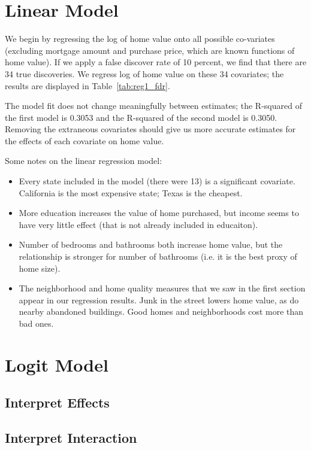 \documentclass[11pt, fleqn]{article}
\begin{document}
\section{Linear Model}

We begin by regressing the log of home value onto all possible co-variates (excluding mortgage amount and purchase price, which are known functions of home value). If we apply a false discover rate of 10 percent, we find that there are 34 true discoveries. We regress log of home value on these 34 covariates; the results are displayed in Table~\vref{tab:reg1_fdr}.

The model fit does not change meaningfully between estimates; the R-squared of the first model is 0.3053 and the R-squared of the second model is 0.3050. Removing the extraneous covariates should give us more accurate estimates for the effects of each covariate on home value.

Some notes on the linear regression model:
\begin{itemize}
  \item Every state included in the model (there were 13) is a significant covariate. California is the most expensive state; Texas is the cheapest.
  \item More education increases the value of home purchased, but income seems to have very little effect (that is not already included in educaiton).
  \item Number of bedrooms and bathrooms both increase home value, but the relationship is stronger for number of bathrooms (i.e. it is the best proxy of home size).
  \item The neighborhood and home quality measures that we saw in the first section appear in our regression results. Junk in the street lowers home value, as do nearby abandoned buildings. Good homes and neighborhoods cost more than bad ones.
\end{itemize}



\section{Logit Model}

\subsection{Interpret Effects}


\subsection{Interpret Interaction}

\end{document}
